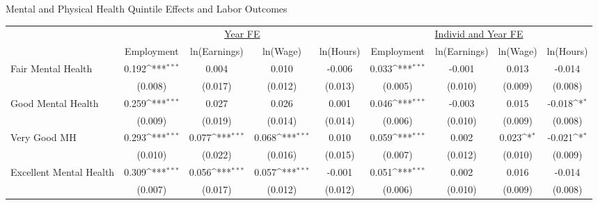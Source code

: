 \def\sym#1{\ifmmode^{#1}\else\(^{#1}\)\fi}
\caption{Mental and Physical Health Quintile Effects and Labor Outcomes}
\footnotesize\begin{tabular}{l*{8}{c}}
                    &\multicolumn{4}{c}{\underline{Year FE}}                                                &\multicolumn{4}{c}{\underline{Individ and Year FE}}                                    \\\cmidrule(lr){2-5}\cmidrule(lr){6-9}
                    &\multicolumn{1}{c}{Employment}&\multicolumn{1}{c}{ln(Earnings)}&\multicolumn{1}{c}{ln(Wage)}&\multicolumn{1}{c}{ln(Hours)}&\multicolumn{1}{c}{Employment}&\multicolumn{1}{c}{ln(Earnings)}&\multicolumn{1}{c}{ln(Wage)}&\multicolumn{1}{c}{ln(Hours)}\\
\hline
Fair Mental Health  &       0.192\sym{***}&       0.004         &       0.010         &      -0.006         &       0.033\sym{***}&      -0.001         &       0.013         &      -0.014         \\
                    &     (0.008)         &     (0.017)         &     (0.012)         &     (0.013)         &     (0.005)         &     (0.010)         &     (0.009)         &     (0.008)         \\
Good Mental Health  &       0.259\sym{***}&       0.027         &       0.026         &       0.001         &       0.046\sym{***}&      -0.003         &       0.015         &      -0.018\sym{*}  \\
                    &     (0.009)         &     (0.019)         &     (0.014)         &     (0.014)         &     (0.006)         &     (0.010)         &     (0.009)         &     (0.008)         \\
Very Good MH        &       0.293\sym{***}&       0.077\sym{***}&       0.068\sym{***}&       0.010         &       0.059\sym{***}&       0.002         &       0.023\sym{*}  &      -0.021\sym{*}  \\
                    &     (0.010)         &     (0.022)         &     (0.016)         &     (0.015)         &     (0.007)         &     (0.012)         &     (0.010)         &     (0.009)         \\
Excellent Mental Health&       0.309\sym{***}&       0.056\sym{***}&       0.057\sym{***}&      -0.001         &       0.051\sym{***}&       0.002         &       0.016         &      -0.014         \\
                    &     (0.007)         &     (0.017)         &     (0.012)         &     (0.012)         &     (0.006)         &     (0.010)         &     (0.009)         &     (0.008)         \\

\end{tabular}
